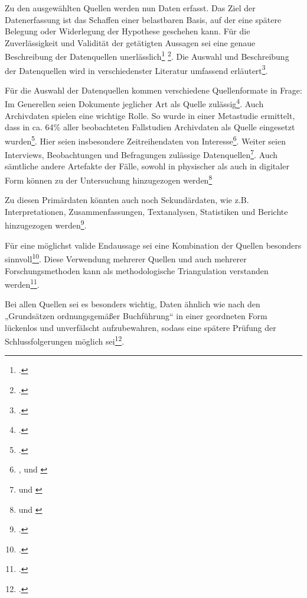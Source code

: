 Zu den ausgewählten Quellen werden nun Daten erfasst. Das Ziel der
Datenerfassung ist das Schaffen einer belastbaren Basis, auf der eine
spätere Belegung oder Widerlegung der Hypothese geschehen kann. Für die
Zuverlässigkeit und Validität der getätigten Aussagen sei eine genaue
Beschreibung der Datenquellen unerlässlich\footcite[Vgl. ][S. 612]{dubeRigorInformationSystems2003} \footcite[Vgl. ][S. 614]{dubeRigorInformationSystems2003}. Die Auswahl und
Beschreibung der Datenquellen wird in verschiedenster Literatur
umfassend erläutert\footcite[Vgl. ][S. 560-569]{girtlerMethodenFeldforschung2001}.

  Für die Auswahl der Datenquellen kommen verschiedene Quellenformate in
Frage: Im Generellen seien Dokumente jeglicher Art als Quelle
zulässig\footcite[Vgl. ][S.10]{gothlichFallstudienAlsForschungsmethode2003}.
Auch Archivdaten spielen eine wichtige Rolle. So wurde in einer
Metastudie ermittelt, dass in ca. 64\% aller beobachteten Fallstudien
Archivdaten als Quelle eingesetzt wurden\footcite[Vgl. ][S. 614]{dubeRigorInformationSystems2003}. Hier seien insbesondere Zeitreihendaten von Interesse\footnote{\cite[Vgl. ][]{benbasatCaseResearchStrategy1987}, \cite[][]{eisenhardtBuildingTheoriesCase1989} und \cite[][S. 612]{dubeRigorInformationSystems2003}}. Weiter seien Interviews,
Beobachtungen und Befragungen zulässige Datenquellen\footnote{\cite[Vgl. ][]{benbasatCaseResearchStrategy1987} und \cite[][S. 612]{dubeRigorInformationSystems2003}}. Auch sämtliche andere Artefakte der Fälle, sowohl in
physischer als auch in digitaler Form können zu der Untersuchung
hinzugezogen werden\footnote{\cite[Vgl. ][S. 10]{gothlichFallstudienAlsForschungsmethode2003} und \cite[][S. 612]{dubeRigorInformationSystems2003}}

Zu diesen Primärdaten könnten auch noch Sekundärdaten, wie z.B.
Interpretationen, Zusammenfassungen, Textanalysen, Statistiken und
Berichte hinzugezogen werden\footcite[Vgl. ][S. 11]{gothlichFallstudienAlsForschungsmethode2003}.

Für eine möglichst valide Endaussage sei eine Kombination der Quellen
besonders sinnvoll\footcite[Vgl. ][S. 10]{gothlichFallstudienAlsForschungsmethode2003}.
Diese Verwendung mehrerer Quellen und auch mehrerer Forschungsmethoden
kann als methodologische Triangulation verstanden werden\footcite[Vgl. ][S. 10]{gothlichFallstudienAlsForschungsmethode2003}.

Bei allen Quellen sei es besonders wichtig, Daten ähnlich wie nach den
„Grundsätzen ordnungsgemäßer Buchführung`` in einer geordneten Form
lückenlos und unverfälscht aufzubewahren, sodass eine spätere Prüfung
der Schlussfolgerungen möglich sei\footcite[Vgl. ][S. 11]{gothlichFallstudienAlsForschungsmethode2003}.

